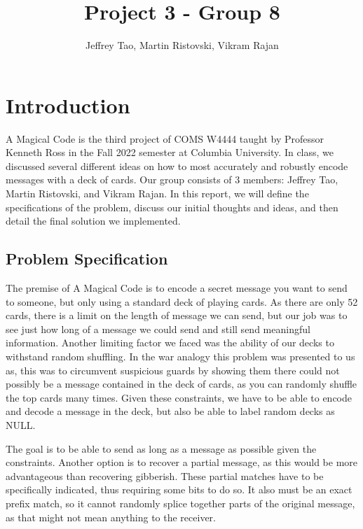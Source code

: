 \documentclass{article}
\title{Project 3 - Group 8}
\author{Jeffrey Tao, Martin Ristovski, Vikram Rajan}
\begin{document}
\maketitle

\tableofcontents

\pagebreak

\section{Introduction}

A Magical Code is the third project of COMS W4444 taught by Professor Kenneth Ross in the Fall 2022 semester at Columbia University. In class, we discussed several different ideas on how to most accurately and robustly encode messages with a deck of cards. Our group consists of 3 members: Jeffrey Tao, Martin Ristovski, and Vikram Rajan. In this report, we will define the specifications of the problem, discuss our initial thoughts and ideas, and then detail the final solution we implemented. 

\subsection{Problem Specification}

The premise of A Magical Code is to encode a secret message you want to send to someone, but only using a standard deck of playing cards. As there are only 52 cards, there is a limit on the length of message we can send, but our job was to see just how long of a message we could send and still send meaningful information. Another limiting factor we faced was the ability of our decks to withstand random shuffling. In the war analogy this problem was presented to us as, this was to circumvent suspicious guards by showing them there could not possibly be a message contained in the deck of cards, as you can randomly shuffle the top cards many times. Given these constraints, we have to be able to encode and decode a message in the deck, but also be able to label random decks as NULL. 

The goal is to be able to send as long as a message as possible given the constraints. Another option is to recover a partial message, as this would be more advantageous than recovering gibberish. These partial matches have to be specifically indicated, thus requiring some bits to do so. It also must be an exact prefix match, so it cannot randomly splice together parts of the original message, as that might not mean anything to the receiver. 
\end{document}
